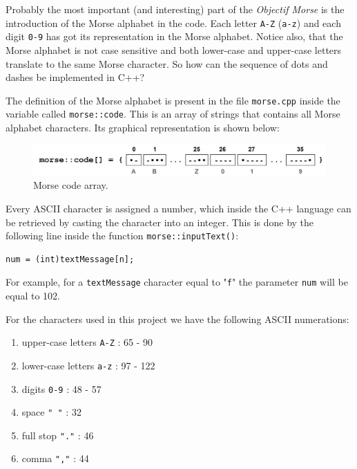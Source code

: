 \documentclass[10pt]{report}
\begin{document}
Probably the most important (and interesting) part of the \textit{Objectif Morse} is the introduction of the Morse alphabet in the code. Each letter \verb|A-Z| (\verb|a-z|) and each digit \verb|0-9| has got its representation in the Morse alphabet. Notice also, that the Morse alphabet is not case sensitive and both lower-case and upper-case letters translate to the same Morse character. So how can the sequence of dots and dashes be implemented in C++?

The definition of the Morse alphabet is present in the file \verb|morse.cpp| inside the variable called \verb|morse::code|. This is an array of strings that contains all Morse alphabet characters. Its graphical representation is shown below:

\begin{figure}[H]
\centering\includegraphics[scale=0.1]{morse--code}
\caption{Morse code array.}				
\label{fig:morse_code_array}
\end{figure}

Every ASCII character is assigned a number, which inside the C++ language can be retrieved by casting the character into an integer. This is done by the following line inside the function \verb|morse::inputText()|: 

\begin{lstlisting}
num = (int)textMessage[n];
\end{lstlisting}

For example, for a \verb|textMessage| character equal to "\verb|f|" the parameter \verb|num| will be equal to 102.

For the characters used in this project we have the following ASCII numerations:

\begin{enumerate}

\item upper-case letters \verb|A-Z| : 65 - 90

\item lower-case letters \verb|a-z| : 97 - 122

\item digits \verb|0-9| : 48 - 57

\item space \verb|" "| : 32

\item full stop \verb|"."| : 46

\item comma \verb|","| : 44

\end{enumerate}
\end{document}
